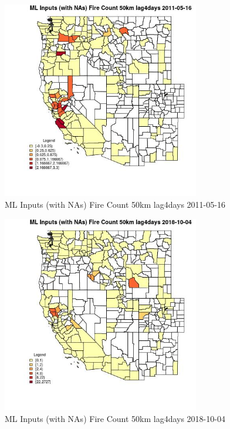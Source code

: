 \begin{figure} 
\centering  
\includegraphics[width=0.77\textwidth]{Code_Outputs/Report_ML_input_PM25_Step4_part_f_de_duplicated_aves_prioritize_24hr_obswNAs_CountyFire_Count_50km_lag4daysMean2011-05-16.jpg} 
\caption{\label{fig:Report_ML_input_PM25_Step4_part_f_de_duplicated_aves_prioritize_24hr_obswNAsCountyFire_Count_50km_lag4daysMean2011-05-16}ML Inputs (with NAs) Fire Count 50km lag4days 2011-05-16} 
\end{figure} 
 

\begin{figure} 
\centering  
\includegraphics[width=0.77\textwidth]{Code_Outputs/Report_ML_input_PM25_Step4_part_f_de_duplicated_aves_prioritize_24hr_obswNAs_CountyFire_Count_50km_lag4daysMean2018-10-04.jpg} 
\caption{\label{fig:Report_ML_input_PM25_Step4_part_f_de_duplicated_aves_prioritize_24hr_obswNAsCountyFire_Count_50km_lag4daysMean2018-10-04}ML Inputs (with NAs) Fire Count 50km lag4days 2018-10-04} 
\end{figure} 
 

